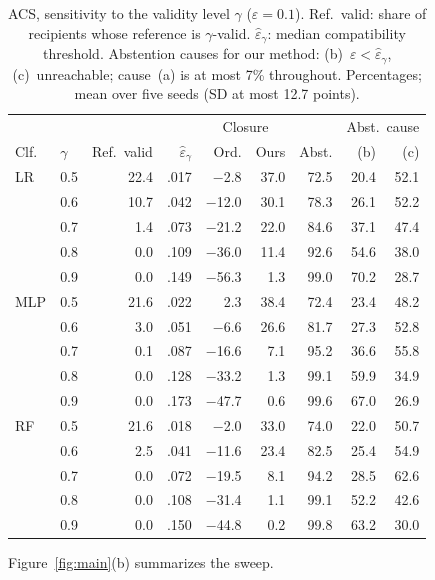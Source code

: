\begin{table}[t]
\centering
\small
\caption{ACS, sensitivity to the validity level $\gamma$ ($\varepsilon=0.1$).
Ref.\ valid: share of recipients whose reference is $\gamma$-valid.
$\hat\varepsilon_\gamma$: median compatibility threshold. Abstention causes
for our method: (b)~$\varepsilon<\hat\varepsilon_\gamma$, (c)~unreachable;
cause~(a) is at most 7\% throughout. Percentages; mean over five seeds (SD
at most 12.7 points).}
\label{tab:gamma_acs}
\setlength{\tabcolsep}{3.5pt}
\begin{tabular}{llrrrrrrr}
\hline
& & & & \multicolumn{2}{c}{Closure} & & \multicolumn{2}{c}{Abst.\ cause} \\
Clf. & $\gamma$ & Ref.\ valid & $\hat\varepsilon_\gamma$ & Ord. & Ours & Abst. & (b) & (c) \\
\hline
LR  & 0.5 & 22.4 & .017 & $-$2.8  & 37.0 & 72.5 & 20.4 & 52.1 \\
    & 0.6 & 10.7 & .042 & $-$12.0 & 30.1 & 78.3 & 26.1 & 52.2 \\
    & 0.7 &  1.4 & .073 & $-$21.2 & 22.0 & 84.6 & 37.1 & 47.4 \\
    & 0.8 &  0.0 & .109 & $-$36.0 & 11.4 & 92.6 & 54.6 & 38.0 \\
    & 0.9 &  0.0 & .149 & $-$56.3 &  1.3 & 99.0 & 70.2 & 28.7 \\
\hline
MLP & 0.5 & 21.6 & .022 &    2.3  & 38.4 & 72.4 & 23.4 & 48.2 \\
    & 0.6 &  3.0 & .051 &  $-$6.6 & 26.6 & 81.7 & 27.3 & 52.8 \\
    & 0.7 &  0.1 & .087 & $-$16.6 &  7.1 & 95.2 & 36.6 & 55.8 \\
    & 0.8 &  0.0 & .128 & $-$33.2 &  1.3 & 99.1 & 59.9 & 34.9 \\
    & 0.9 &  0.0 & .173 & $-$47.7 &  0.6 & 99.6 & 67.0 & 26.9 \\
\hline
RF  & 0.5 & 21.6 & .018 &  $-$2.0 & 33.0 & 74.0 & 22.0 & 50.7 \\
    & 0.6 &  2.5 & .041 & $-$11.6 & 23.4 & 82.5 & 25.4 & 54.9 \\
    & 0.7 &  0.0 & .072 & $-$19.5 &  8.1 & 94.2 & 28.5 & 62.6 \\
    & 0.8 &  0.0 & .108 & $-$31.4 &  1.1 & 99.1 & 52.2 & 42.6 \\
    & 0.9 &  0.0 & .150 & $-$44.8 &  0.2 & 99.8 & 63.2 & 30.0 \\
\hline
\end{tabular}
\end{table}


Figure~\ref{fig:main}(b) summarizes the sweep.

